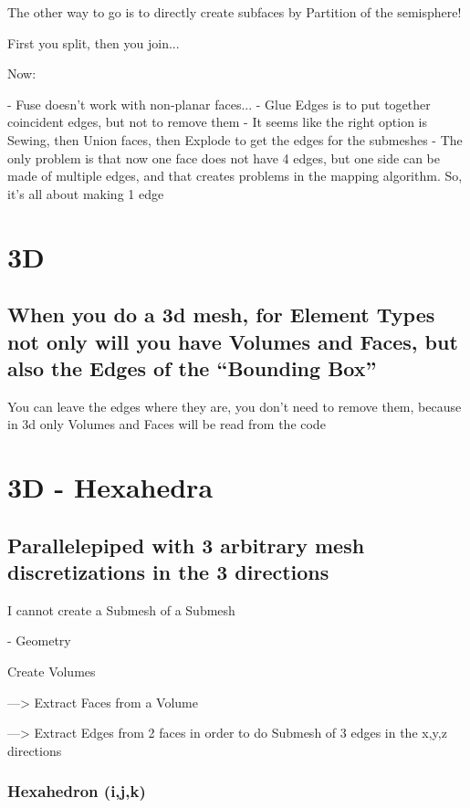 \documentclass[10pt]{book}
\begin{document}
 The other way to go is to directly create subfaces by Partition of the semisphere!
 
 First you split, then you join...
 
 Now:
 
 - Fuse doesn't work with non-planar faces...
 - Glue Edges is to put together coincident edges, but not to remove them
 - It seems like the right option is Sewing, then Union faces, then Explode to get the edges for the submeshes
 - The only problem is that now one face does not have 4 edges, but one side can be made of multiple edges,
   and that creates problems in the mapping algorithm. So, it's all about making 1 edge
   
\section{3D}


\subsection{When you do a 3d mesh, for Element Types not only will you have Volumes and Faces, but also the Edges of the ``Bounding Box''}

  You can leave the edges where they are, 
  you don't need to remove them,
  because in 3d only Volumes and Faces will be read from the code
 


\section{3D - Hexahedra}


 \subsection{Parallelepiped with 3 arbitrary mesh discretizations in the 3 directions}

I cannot create a Submesh of a Submesh

- Geometry

  Create Volumes
  
    ---> Extract Faces from a Volume
    
    ---> Extract Edges from 2 faces in order to do Submesh of 3 edges in the x,y,z directions

    
    \subsubsection{Hexahedron (i,j,k)}
    
\end{document}
